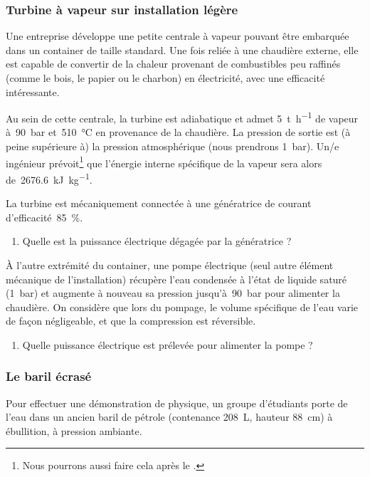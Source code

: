 \subsubsection{Turbine à vapeur sur installation légère}

	Une entreprise développe une petite centrale à vapeur pouvant être embarquée dans un container de taille standard. Une fois reliée à une chaudière externe, elle est capable de convertir de la chaleur provenant de combustibles peu raffinés (comme le bois, le papier ou le charbon) en électricité, avec une efficacité intéressante.
	
	Au sein de cette centrale, la turbine est adiabatique et admet \SI{5}{\tonne\per\hour} de vapeur à~\SI{90}{\bar} et~\SI{510}{\degreeCelsius} en provenance de la chaudière. La pression de sortie est (à peine supérieure à) la pression atmosphérique (nous prendrons \SI{1}{\bar}). Un/e ingénieur prévoit\footnote{Nous pourrons aussi faire cela après le \courshuit.} que l’énergie interne spécifique de la vapeur sera alors de~\SI{2676,6}{\kilo\joule\per\kilogram}.
	
	La turbine est mécaniquement connectée à une génératrice de courant d’efficacité~\SI{85}{\percent}.
	
	\begin{enumerate}
		\item Quelle est la puissance électrique dégagée par la génératrice ?
	\end{enumerate}
	
	À l’autre extrémité du container, une pompe électrique (seul autre élément mécanique de l’installation) récupère l’eau condensée à l’état de liquide saturé (\SI{1}{\bar}) et augmente à nouveau sa pression jusqu’à~\SI{90}{\bar} pour alimenter la chaudière. On considère que lors du pompage, le volume spécifique de l’eau varie de façon négligeable, et que la compression est réversible.
	
	\begin{enumerate}
		\item Quelle puissance électrique est prélevée pour alimenter la pompe ?
	\end{enumerate}
	



\subsubsection{Le baril écrasé}

	Pour effectuer une démonstration de physique, un groupe d’étudiants porte de l’eau  dans un ancien baril de pétrole (contenance \SI{208}{\liter}, hauteur \SI{88}{\centi\metre}) à ébullition, à pression ambiante.
	
